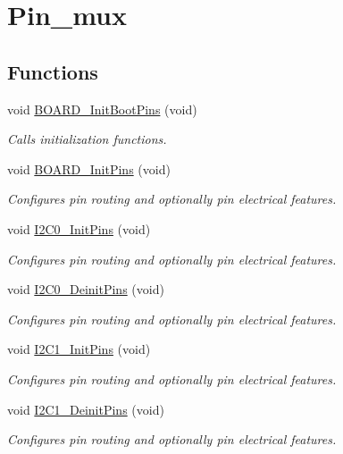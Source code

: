 \hypertarget{group__pin__mux}{\section{Pin\-\_\-mux}
\label{group__pin__mux}
}
\subsection*{Functions}
\begin{DoxyCompactItemize}
\item 
void \hyperlink{group__pin__mux_ga8652eb15efb9dfe7368dd7f292dab554}{B\-O\-A\-R\-D\-\_\-\-Init\-Boot\-Pins} (void)
\begin{DoxyCompactList}\small\item\em Calls initialization functions. \end{DoxyCompactList}\item 
void \hyperlink{group__pin__mux_ga2c9fe54b6b84723fbaa590a6f4576966}{B\-O\-A\-R\-D\-\_\-\-Init\-Pins} (void)
\begin{DoxyCompactList}\small\item\em Configures pin routing and optionally pin electrical features. \end{DoxyCompactList}\item 
void \hyperlink{group__pin__mux_ga3a18c9665d7d526b76488e90a271cc8e}{I2\-C0\-\_\-\-Init\-Pins} (void)
\begin{DoxyCompactList}\small\item\em Configures pin routing and optionally pin electrical features. \end{DoxyCompactList}\item 
void \hyperlink{group__pin__mux_ga8e9cb3ef8722919469dc52bd99cb9cc5}{I2\-C0\-\_\-\-Deinit\-Pins} (void)
\begin{DoxyCompactList}\small\item\em Configures pin routing and optionally pin electrical features. \end{DoxyCompactList}\item 
void \hyperlink{group__pin__mux_gaa63f3828e7f823cef465873563ca99c4}{I2\-C1\-\_\-\-Init\-Pins} (void)
\begin{DoxyCompactList}\small\item\em Configures pin routing and optionally pin electrical features. \end{DoxyCompactList}\item 
void \hyperlink{group__pin__mux_ga455ca4e86bd4798c0368a926fe30f692}{I2\-C1\-\_\-\-Deinit\-Pins} (void)
\begin{DoxyCompactList}\small\item\em Configures pin routing and optionally pin electrical features. \end{DoxyCompactList}\end{DoxyCompactItemize}


